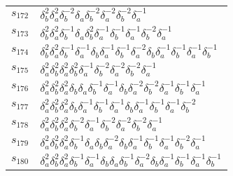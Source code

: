 \documentclass{article}
\begin{document}
\begin{center}
\begin{tabular}{ll}
$s_{172}$ & $\delta_b^{2}\delta_a^{2}\delta_b^{-2}\delta_a^{}\delta_b^{-2}\delta_a^{-2}\delta_b^{-2}\delta_a^{-1}$ \\
$s_{173}$ & $\delta_b^{2}\delta_a^{2}\delta_b^{-1}\delta_a^{}\delta_b^{2}\delta_a^{-1}\delta_b^{-1}\delta_a^{-1}\delta_b^{-2}\delta_a^{-1}$ \\
$s_{174}$ & $\delta_b^{2}\delta_a^{2}\delta_b^{-1}\delta_a^{-1}\delta_b^{}\delta_a^{-1}\delta_b^{-1}\delta_a^{-2}\delta_b^{}\delta_a^{-1}\delta_b^{-1}\delta_a^{-1}\delta_b^{-1}$ \\
$s_{175}$ & $\delta_a^{2}\delta_b^{2}\delta_a^{2}\delta_b^{2}\delta_a^{-1}\delta_b^{-2}\delta_a^{-2}\delta_b^{-2}\delta_a^{-1}$ \\
$s_{176}$ & $\delta_a^{2}\delta_b^{2}\delta_a^{2}\delta_b^{}\delta_a^{}\delta_b^{-1}\delta_a^{-1}\delta_b^{}\delta_a^{-2}\delta_b^{-2}\delta_a^{-1}\delta_b^{-1}\delta_a^{-1}$ \\
$s_{177}$ & $\delta_a^{2}\delta_b^{2}\delta_a^{2}\delta_b^{}\delta_a^{-1}\delta_b^{-1}\delta_a^{-1}\delta_b^{}\delta_a^{-1}\delta_b^{-1}\delta_a^{-1}\delta_b^{-2}$ \\
$s_{178}$ & $\delta_a^{2}\delta_b^{2}\delta_a^{2}\delta_b^{-2}\delta_a^{-1}\delta_b^{-2}\delta_a^{-2}\delta_b^{-2}\delta_a^{-1}$ \\
$s_{179}$ & $\delta_a^{2}\delta_b^{2}\delta_a^{2}\delta_b^{-1}\delta_a^{}\delta_b^{}\delta_a^{-2}\delta_b^{}\delta_a^{-1}\delta_b^{-1}\delta_a^{-1}\delta_b^{-2}\delta_a^{-1}$ \\
$s_{180}$ & $\delta_a^{2}\delta_b^{2}\delta_a^{2}\delta_b^{-1}\delta_a^{-1}\delta_b^{}\delta_a^{}\delta_b^{-1}\delta_a^{-2}\delta_b^{}\delta_a^{-1}\delta_b^{-1}\delta_a^{-1}\delta_b^{-1}$ \\
\bottomrule
\end{tabular}
\end{center}

\thispagestyle{empty}
\end{document}
